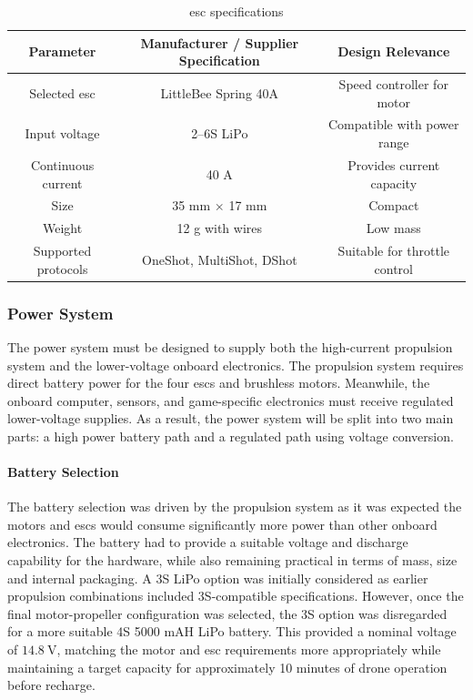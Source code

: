 \documentclass{report_template_oxford}
\begin{document}
\begin{table}[htbp]
\centering
\caption[\gls{esc} specifications]{\gls{esc} specifications\footnotemark}
\label{tab:esc_specifications}
\begin{tabular}{|c|c|c|}
\hline
\textbf{Parameter} & \textbf{Manufacturer / Supplier Specification} & \textbf{Design Relevance} \\
\hline
Selected \gls{esc} & LittleBee Spring 40A & Speed controller for motor \\
\hline
Input voltage & 2--6S LiPo & Compatible with power range \\
\hline
Continuous current & 40 A & Provides current capacity  \\
\hline
Size &  35 mm $\times$ 17 mm & Compact \\
\hline
Weight &  12 g with wires & Low mass \\
\hline
Supported protocols & OneShot, MultiShot, DShot & Suitable for throttle control \\
\hline
\end{tabular}
\end{table}


\subsubsection{Power System}
\label{sec:power_system}

The power system must be designed to supply both the high-current propulsion system and the lower-voltage onboard electronics. The propulsion system requires direct battery power for the four \gls{esc}s and brushless motors. Meanwhile, the onboard computer, sensors, and game-specific electronics must receive regulated lower-voltage supplies. As a result, the power system will be split into two main parts: a high power battery path and a regulated path using voltage conversion.

\paragraph{Battery Selection}

The battery selection was driven by the propulsion system as it was expected the motors and \gls{esc}s would consume significantly more power than other onboard electronics. The battery had to provide a suitable voltage and discharge capability for the hardware, while also remaining practical in terms of mass, size and internal packaging. A 3S LiPo option was initially considered as earlier propulsion combinations included 3S-compatible specifications. However, once the final motor-propeller configuration was selected, the 3S option was disregarded for a more suitable 4S 5000 mAH LiPo battery. This provided a nominal voltage of \(14.8~\text{V}\), matching the motor and \gls{esc} requirements more appropriately while maintaining a target capacity for approximately 10 minutes of drone operation before recharge.
\end{document}
